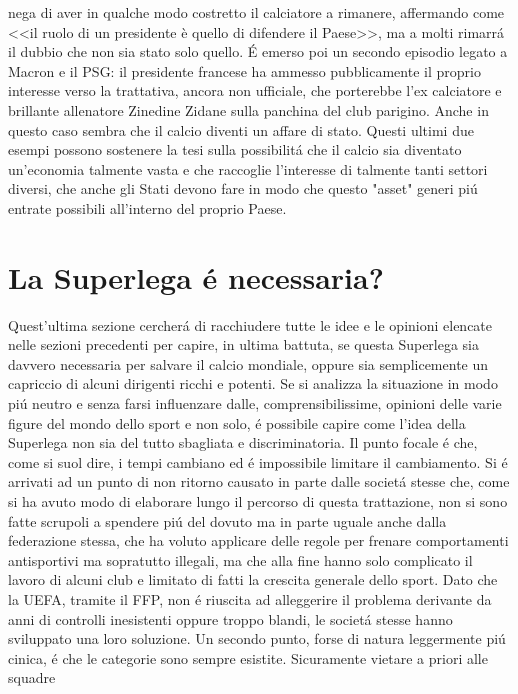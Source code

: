 \documentclass[
    corpo=12pt,
    oneside,
    evenboxes,
    tipotesi=triennale,
    stile=classica,
    oldstyle,
    autoretitolo,
    greek,
]{toptesi}
\begin{document}
\begin{interlinea}{1.5}
nega di aver in qualche modo costretto il calciatore a rimanere, affermando come <<il ruolo di un presidente è quello di difendere il Paese>>, ma 
a molti rimarr\'a il dubbio che non sia stato solo quello. \'E emerso poi un secondo episodio legato a Macron e il PSG: il presidente francese ha ammesso pubblicamente
il proprio interesse verso la trattativa, ancora non ufficiale, che porterebbe l'ex calciatore e brillante allenatore Zinedine Zidane sulla 
panchina del club parigino. Anche in questo caso sembra che il calcio diventi un affare di stato.
Questi ultimi due esempi possono sostenere la tesi sulla possibilit\'a che il calcio sia diventato un'economia talmente vasta e che raccoglie
l'interesse di talmente tanti settori diversi, che anche gli Stati devono fare in modo che questo "asset" generi pi\'u entrate possibili all'interno
del proprio Paese.
\section{La Superlega \'e necessaria?}
Quest'ultima sezione cercher\'a di racchiudere tutte le idee e le opinioni elencate nelle sezioni precedenti per capire, in ultima battuta,
se questa Superlega sia davvero necessaria per salvare il calcio mondiale, oppure sia semplicemente un capriccio di alcuni dirigenti
ricchi e potenti.\newline
Se si analizza la situazione in modo pi\'u neutro e senza farsi influenzare dalle, comprensibilissime, opinioni delle varie figure del mondo 
dello sport e non solo, \'e possibile capire come l'idea della Superlega non sia del tutto sbagliata e discriminatoria.
Il punto focale \'e che, come si suol dire, i tempi cambiano ed \'e impossibile limitare il cambiamento. Si \'e arrivati ad un punto di non ritorno
causato in parte dalle societ\'a stesse che, come si ha avuto modo di elaborare lungo il percorso di questa trattazione, non si sono fatte scrupoli 
a spendere pi\'u del dovuto ma in parte uguale anche dalla federazione stessa, che ha voluto applicare delle regole per frenare comportamenti antisportivi 
ma sopratutto illegali, ma che alla fine hanno solo complicato il lavoro di alcuni club e limitato di fatti la crescita generale dello sport. Dato che la UEFA, tramite il FFP, non \'e riuscita
ad alleggerire il problema derivante da anni di controlli inesistenti oppure troppo blandi, le societ\'a stesse hanno sviluppato una loro soluzione.
Un secondo punto, forse di natura leggermente pi\'u cinica, \'e che le categorie sono sempre esistite. Sicuramente vietare a priori alle squadre

\end{interlinea}
\end{document}
